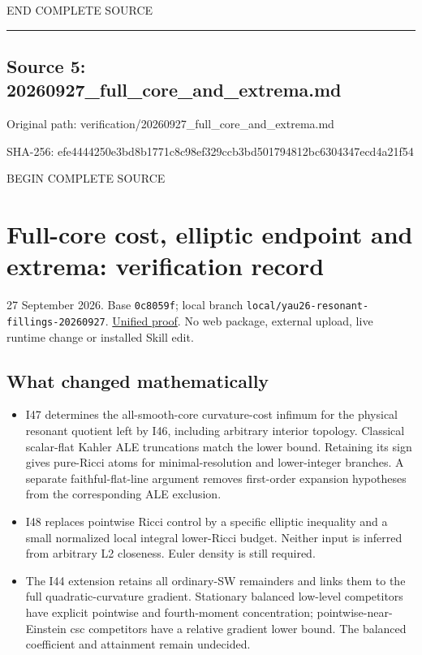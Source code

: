 \documentclass[
  10pt,
]{article}
\providecommand{\tightlist}{%
  \setlength{\itemsep}{0pt}\setlength{\parskip}{0pt}}
\begin{document}
END COMPLETE SOURCE

\begin{center}\rule{0.5\linewidth}{0.5pt}\end{center}

\hypertarget{source-5-20260927_full_core_and_extrema.md}{%
\subsection{Source 5:
20260927\_full\_core\_and\_extrema.md}\label{source-5-20260927_full_core_and_extrema.md}}

Original path: verification/20260927\_full\_core\_and\_extrema.md

SHA-256:
efe4444250e3bd8b1771c8c98ef329ccb3bd501794812bc6304347ecd4a21f54

BEGIN COMPLETE SOURCE

\hypertarget{full-core-cost-elliptic-endpoint-and-extrema-verification-record}{%
\section{Full-core cost, elliptic endpoint and extrema: verification
record}\label{full-core-cost-elliptic-endpoint-and-extrema-verification-record}}

27 September 2026. Base \texttt{0c8059f}; local branch
\texttt{local/yau26-resonant-fillings-20260927}.
\href{../continuation/20260927_full_core_cost_and_extremal_metrics.md}{Unified
proof}. No web package, external upload, live runtime change or
installed Skill edit.

\hypertarget{what-changed-mathematically-1}{%
\subsection{What changed
mathematically}\label{what-changed-mathematically-1}}

\begin{itemize}
\tightlist
\item
  I47 determines the all-smooth-core curvature-cost infimum for the
  physical resonant quotient left by I46, including arbitrary interior
  topology. Classical scalar-flat Kahler ALE truncations match the lower
  bound. Retaining its sign gives pure-Ricci atoms for
  minimal-resolution and lower-integer branches. A separate
  faithful-flat-line argument removes first-order expansion hypotheses
  from the corresponding ALE exclusion.
\item
  I48 replaces pointwise Ricci control by a specific elliptic inequality
  and a small normalized local integral lower-Ricci budget. Neither
  input is inferred from arbitrary L2 closeness. Euler density is still
  required.
\item
  The I44 extension retains all ordinary-SW remainders and links them to
  the full quadratic-curvature gradient. Stationary balanced low-level
  competitors have explicit pointwise and fourth-moment concentration;
  pointwise-near-Einstein csc competitors have a relative gradient lower
  bound. The balanced coefficient and attainment remain undecided.
\end{itemize}
\end{document}
